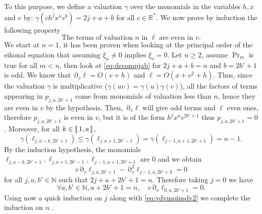 \documentclass[12pt]{amsart}
\newcommand{\N}{\mathbb N}
\newcommand{\R}{\mathbb R}
\numberwithin{equation}{section}
\numberwithin{figure}{section}
\DeclareMathOperator{\p}{\partial}
\newcommand{\lb}{\operatorname{[\negthinspace [}}
\newcommand{\rb}{\operatorname{]\negthinspace ]}}
\begin{document}
To this purpose, we define a valuation $\gamma$ over the monomials in the variables $h,x$ and $v$ by: $\gamma(ch^jx^av^b) = 2j+a+b$ for all $c\in\R^*$. We now prove by induction the %
following property
\begin{equation*}\label{HR}\tag{$\Pr_n$}
\text{The terms of valuation }n\text{ in }\ell\text{ are even in }v.
\end{equation*}
We %
start at $n=1$, it has been proven when looking at the principal order of the eikonal equation that assuming $\xi_x \neq 0$ implies $\xi_v = 0$. Let $n\geq2$, assume $\Pr_m$ is true for all $m<n$, then look at \eqref{eq:decompjab} for $2j+a+b = n$ and $b=2b'+1$ is odd. We know that $\p_v\ell = O(v+h)$ and $\ell = O(x + v^2 + h)$. Thus, since the valuation $\gamma$ is multiplicative ($\gamma(uv) = \gamma(u)\gamma(v)$), all the factors of terms appearing in $p_{j,a,2b'+1}$ come from monomials of valuation less than $n$, hence they are even in $v$ by the hypothesis. Then, $\p_v\ell$ will give odd terms and $\ell$ even ones, therefore $p_{j,a,2b'+1}$ is even in $v$, but it is of the form $h^jx^av^{2b'+1}$ thus $p_{j,a,2b'+1} = 0$. Moreover, for all $k\in\lb1,a\rb$,
\begin{equation*}
\gamma(\ell_{j,a-k,2b'+1}) \leq \gamma(\ell_{j,a+1,2b'-1}) = \gamma(\ell_{j-1,a+1,2b'+1}) = n-1.
\end{equation*}
By the induction hypothesis, the monomials $\ell_{j,a-k,2b'+1}, \ell_{j,a+1,2b'-1}, \ell_{j-1,a+1,2b'+1}$ are $0$ and we obtain
\begin{equation}\label{eq:vdvmoinsdv2}
v\p_v\ell_{j,a,2b'+1} - \p_v^2\ell_{j-1,a,2b'+3} = 0
\end{equation}
for all $j,a,b'\in\N$ such that $2j+a+2b'+1 = n$. Therefore %
taking $j=0$ we %
have
\begin{equation*}
\forall a,b'\in\N,a+2b'+1=n,\quad v\p_v\ell_{0,a,2b'+1} = 0.
\end{equation*}
Using now a quick induction on $j$ along %
with \eqref{eq:vdvmoinsdv2} we %
complete the induction on $n$%
.
\end{document}
